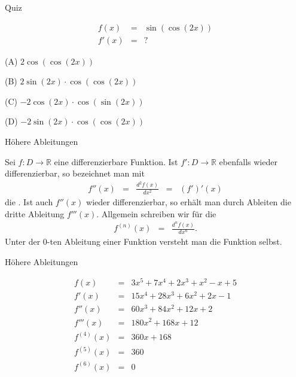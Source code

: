 \documentclass[german]{beamer}
\newcommand{\bq}{\begin{eqnarray*}}
\newcommand{\eq}{\end{eqnarray*}}
\newcommand{\superalert}[1]{{\color{MyYellowOrange}{#1}}}
\begin{document}
\begin{frame}{Quiz}

\bq
 f\left(x\right) & = & \sin\left(\cos\left(2x\right)\right)
 \nonumber \\
 f'\left(x\right) & = & ?
\eq
\begin{description}
\item{(A)} $2 \cos\left(\cos\left(2x\right)\right)$
\item{(B)} $2 \sin\left(2x\right) \cdot \cos\left(\cos\left(2x\right)\right)$
\item{(C)} $- 2 \cos\left(2x\right) \cdot \cos\left(\sin\left(2x\right)\right)$
\item{(D)} $- 2 \sin\left(2x\right) \cdot \cos\left(\cos\left(2x\right)\right)$
\end{description}

\end{frame}

\begin{frame}{H\"ohere Ableitungen}

Sei $f : D \rightarrow {\mathbb R}$ eine differenzierbare Funktion.
Ist $f' : D \rightarrow {\mathbb R}$ ebenfalls wieder differenzierbar, so bezeichnet man
mit
\bq
 f''(x) & = &
 \frac{d^2 f(x)}{dx^2}
 \;\; = \;\;
 (f')'(x)
\eq
die \superalert{zweite Ableitung}. Ist auch $f''(x)$ wieder differenzierbar, so erh\"alt man durch Ableiten
die dritte Ableitung $f'''(x)$.
Allgemein schreiben wir f\"ur die \superalert{$n$-te Ableitung}
\bq
 f^{(n)}(x) & = &
 \frac{d^nf(x)}{dx^n}.
\eq
Unter der \alert{$0$-ten Ableitung} einer Funktion versteht man die Funktion selbst.

\end{frame}

\begin{frame}{H\"ohere Ableitungen}

\begin{example}
\bq
 f\left(x\right) & = & 3 x^5 + 7 x^4 + 2 x^3 + x^2 - x + 5
 \nonumber \\
 f'\left(x\right) & = & 15 x^4 + 28 x^3 + 6 x^2 + 2 x - 1
 \nonumber \\
 f''\left(x\right) & = & 60 x^3 + 84 x^2 + 12 x + 2
 \nonumber \\
 f'''\left(x\right) & = & 180 x^2 + 168 x + 12
 \nonumber \\
 f^{(4)}\left(x\right) & = & 360 x + 168
 \nonumber \\
 f^{(5)}\left(x\right) & = & 360
 \nonumber \\
 f^{(6)}\left(x\right) & = & 0
\eq
\end{example}

\end{frame}
\end{document}
